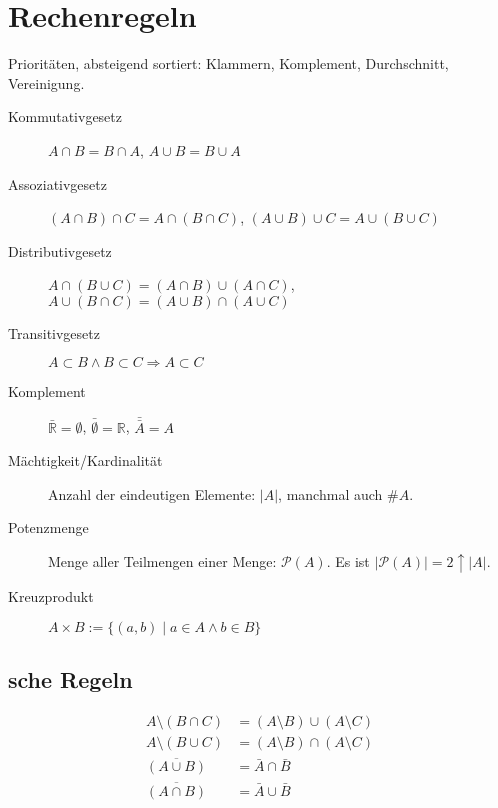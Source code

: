 
\section{Rechenregeln}

Prioritäten, absteigend sortiert: Klammern, Komplement, Durchschnitt,
Vereinigung.
\begin{description}
  \item [Kommutativgesetz] 
	$A\cap B=B\cap A$,
	$A\cup B=B\cup A$
  \item [Assoziativgesetz] 
	$(A\cap B)\cap C=A\cap(B\cap C)$,
	$(A\cup B)\cup C=A\cup(B\cup C)$
  \item [Distributivgesetz] 
	$A\cap(B\cup C)=(A\cap B)\cup(A\cap C)$,
	$A\cup(B\cap C)=(A\cup B)\cap(A\cup C)$
  \item [Transitivgesetz] 
	$A\subset B\land B\subset C\Rightarrow A\subset C$
  \item [Komplement] 
	$\bar{\mathbb{R}}=\emptyset$,
	$\bar{\emptyset}=\mathbb{R}$,
	$\bar{\bar{A}}=A$
  \item [Mächtigkeit/Kardinalität] 
	Anzahl der eindeutigen Elemente: $\lvert A \rvert$, manchmal auch $\#A$.
  \item [Potenzmenge] 
	Menge aller Teilmengen einer Menge: $\mathcal P(A)$. Es ist $\lvert \mathcal P(A) \rvert = 2 \uparrow \lvert A \rvert$.
  \item [Kreuzprodukt] 
	$A\times B:=\{ (a,b)\mid a\in A\land b\in B\} $
\end{description}

\subsection{\protect{}sche Regeln}

\begin{align*}
  A\setminus(B\cap C)  & =(A\setminus B)\cup(A\setminus C)\\
  A\setminus(B\cup C)  & =(A\setminus B)\cap(A\setminus C)\\
  \overline{(A\cup B)} & =\bar{A}\cap\bar{B}\\
  \overline{(A\cap B)} & =\bar{A}\cup\bar{B}
\end{align*}



